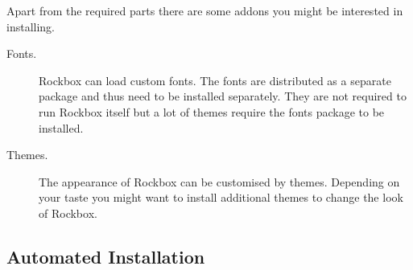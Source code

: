 Apart from the required parts there are some addons you might be interested
in installing.
\begin{description}
\item[Fonts.] Rockbox can load custom fonts. The fonts are
    distributed as a separate package and thus need to be installed
    separately. They are not required to run Rockbox itself but
    a lot of themes require the fonts package to be installed.

\item[Themes.] The appearance of Rockbox can be customised by themes. Depending
    on your taste you might want to install additional themes to change
    the look of Rockbox.
\end{description}

\subsection{Automated Installation}


